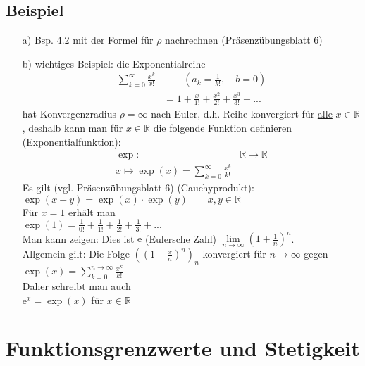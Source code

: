 \documentclass[12pt, titlepage]{article}
\newcommand{\R}{\mathds{R}}
\newcommand{\e}{\textrm{e}}
\newcommand{\infn}{n\rightarrow\infty}
\renewcommand{\>}{\rightarrow}
\renewcommand{\*}{\cdot}
\begin{document}
	\subsection{Beispiel}
	\begin{itemize}
		\item[a)] Bsp. 4.2 mit der Formel für $\rho$ nachrechnen (Präsenzübungsblatt 6)
		\item[b)] wichtiges Beispiel: die Exponentialreihe
		\begin{align*}
			\sum_{k=0}^{\infty}\frac{x^k}{x!}&\qquad(a_k=\frac{1}{k!},\quad b=0)\\
			&=1+\frac{x}{1!}+\frac{x^2}{2!}+\frac{x^3}{3!}+...
		\end{align*}
		hat Konvergenzradius $\rho=\infty$ nach Euler, d.h. Reihe konvergiert für \underline{alle} $x\in\R$, deshalb kann man für $x\in\R$ die folgende Funktion definieren (Exponentialfunktion):
		\begin{align*}
			\exp\colon&\R\>\R\\
			x\mapsto \exp(x)=\sum_{k=0}^{\infty}\frac{x^k}{k!}
		\end{align*}
		Es gilt (vgl. Präsenzübungsblatt 6) (Cauchyprodukt):\\
		$\exp(x+y)=\exp(x)\*\exp(y)\qquad x,y\in\R$\\
		Für $x=1$ erhält man\\
		$\exp(1)=\frac{1}{0!}+\frac{1}{1!}+\frac{1}{2!}+\frac{1}{3!}+...$\\
		Man kann zeigen: Dies ist $\e$ (Eulersche Zahl) $\lim\limits_{\infn}(1+\frac{1}{n})^n$.\\
		Allgemein gilt: Die Folge $((1+\frac{x}{n})^n)_n$ konvergiert für $\infn$ gegen $\exp(x)=\sum_{k=0}^{\infn}\frac{x^k}{k!}$\\
		Daher schreibt man auch\\
		$\e^x=\exp(x)$ für $x\in\R$
	\end{itemize}
	\newpage
	\section{Funktionsgrenzwerte und Stetigkeit}
\end{document}
